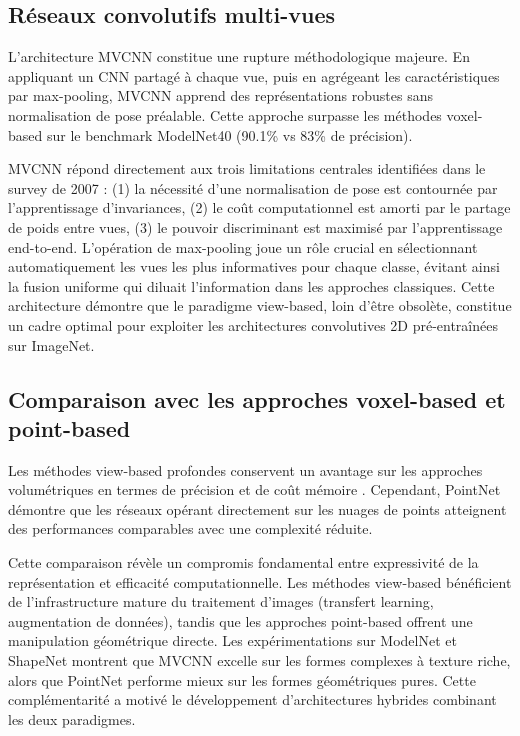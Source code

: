 \documentclass[11pt,a4paper,oneside]{report}
\begin{document}
\subsection{Réseaux convolutifs multi-vues}

L'architecture MVCNN \cite{su2015multi} constitue une rupture méthodologique majeure. En appliquant un CNN partagé à chaque vue, puis en agrégeant les caractéristiques par max-pooling, MVCNN apprend des représentations robustes sans normalisation de pose préalable. Cette approche surpasse les méthodes voxel-based sur le benchmark ModelNet40 (90.1\% vs 83\% de précision).

MVCNN répond directement aux trois limitations centrales identifiées dans le survey de 2007 : (1) la nécessité d'une normalisation de pose est contournée par l'apprentissage d'invariances, (2) le coût computationnel est amorti par le partage de poids entre vues, (3) le pouvoir discriminant est maximisé par l'apprentissage end-to-end. L'opération de max-pooling joue un rôle crucial en sélectionnant automatiquement les vues les plus informatives pour chaque classe, évitant ainsi la fusion uniforme qui diluait l'information dans les approches classiques. Cette architecture démontre que le paradigme view-based, loin d'être obsolète, constitue un cadre optimal pour exploiter les architectures convolutives 2D pré-entraînées sur ImageNet.

\subsection{Comparaison avec les approches voxel-based et point-based}

Les méthodes view-based profondes conservent un avantage sur les approches volumétriques en termes de précision et de coût mémoire \cite{qi2016volumetric}. Cependant, PointNet \cite{qi2017pointnet} démontre que les réseaux opérant directement sur les nuages de points atteignent des performances comparables avec une complexité réduite.

Cette comparaison révèle un compromis fondamental entre expressivité de la représentation et efficacité computationnelle. Les méthodes view-based bénéficient de l'infrastructure mature du traitement d'images (transfert learning, augmentation de données), tandis que les approches point-based offrent une manipulation géométrique directe. Les expérimentations sur ModelNet et ShapeNet montrent que MVCNN excelle sur les formes complexes à texture riche, alors que PointNet performe mieux sur les formes géométriques pures. Cette complémentarité a motivé le développement d'architectures hybrides combinant les deux paradigmes.
\end{document}
